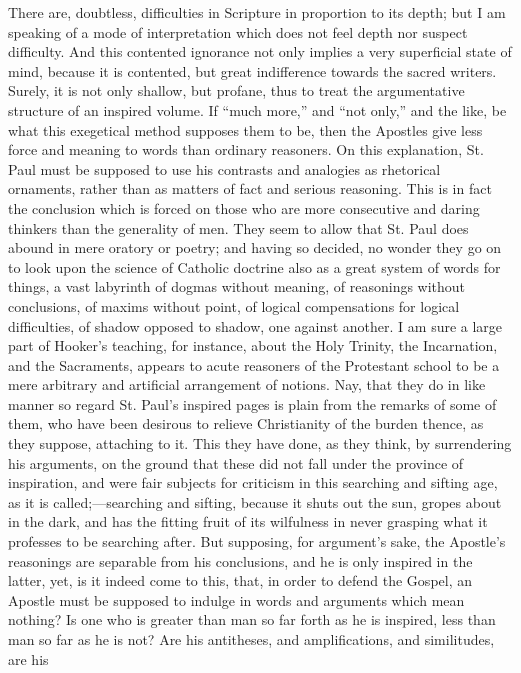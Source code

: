 There are, doubtless, difficulties in Scripture in proportion to
its depth; but I am speaking of a mode of interpretation which does
not feel depth nor suspect difficulty. And this contented ignorance
not only implies a very superficial state of mind, because it is
contented, but great indifference towards the sacred writers. Surely,
it is not only shallow, but profane, thus to treat the argumentative
structure of an inspired volume. If ``much more,'' and
``not only,'' and the like, be what this exegetical method
supposes them to be, then the Apostles give less force and meaning to
words than ordinary reasoners. On this explanation, St. Paul must be
supposed to use his contrasts and analogies as rhetorical ornaments,
rather than as matters of fact and serious reasoning. This is in
fact the conclusion which is forced on those who are more consecutive
and daring thinkers than the generality of men. They seem to allow
that St. Paul does abound in mere oratory or poetry; and having so
decided, no wonder they go on to look upon the science of Catholic
doctrine also as a great system of words for things, a vast labyrinth
of dogmas without meaning, of reasonings without conclusions, of
maxims without point, of logical compensations for logical
difficulties, of shadow opposed to shadow, one against another. I am
sure a large part of Hooker's teaching, for instance, about the Holy
Trinity, the Incarnation, and the Sacraments, appears to acute
reasoners of the Protestant school to be a mere arbitrary and
artificial arrangement of notions. Nay, that they do in like manner so
regard St. Paul's inspired pages is plain from the remarks of some of
them, who have been desirous to relieve Christianity of the burden
thence, as they suppose, attaching to it. This they have done, as they
think, by surrendering his arguments, on the ground that these did not
fall under the province of inspiration, and were fair subjects for
criticism in this searching and sifting age, as it is called;—searching
and sifting, because it shuts out the sun, gropes about in the dark,
and has the fitting fruit of its wilfulness in never grasping what it
professes to be searching after. But supposing, for argument's sake,
the Apostle's reasonings are separable from his conclusions, and he is
only inspired in the latter, yet, is it indeed come to this, that, in
order to defend the Gospel, an Apostle must be supposed to indulge in
words and arguments which mean nothing? Is one who is greater than man so far forth as he is inspired, less than man so far as he is
not? Are his antitheses, and amplifications, and similitudes, are his
